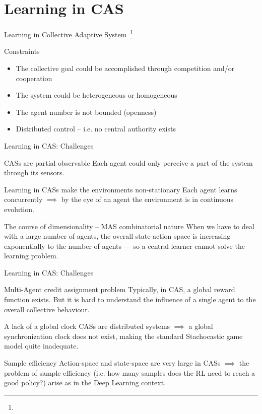 \documentclass[presentation]{beamer}\mode<presentation>{\usetheme{AMSBolognaFC}}
\begin{document}
\section{Learning in CAS}
\begin{frame}[c]{Learning in Collective Adaptive System~\footnote[frame]{}}
\begin{exampleblock}{Constraints}
	\begin{itemize}
		\item The collective goal could be accomplished through competition and/or cooperation 
		\item The system could be heterogeneous or homogeneous
		\item The agent number is not bounded (openness)
		\item Distributed control -- i.e. no central authority exists
	\end{itemize}
\end{exampleblock}
\end{frame}
\begin{frame}[c]{Learning in CAS: Challenges}
	\begin{exampleblock}{CASs are partial observable}
		Each agent could only perceive a part of the system through its sensors.
	\end{exampleblock}
	\begin{alertblock}{Learning in CASs make the environments non-stationary}
		Each agent learns concurrently $\implies$ by the eye of an agent the environment is in continuous evolution.
	\end{alertblock}
	\begin{alertblock}{The course of dimensionality -- MAS combinatorial nature}
		When we have to deal with a large number of agents, the overall state-action space is increasing exponentially to the number of agents --- so a central learner cannot solve the learning problem.
	\end{alertblock}
\end{frame}
\begin{frame}[c]{Learning in CAS: Challenges}
	\begin{exampleblock}{Multi-Agent credit assignment problem}
		Typically, in CAS, a global reward function exists. But it is hard to understand the influence of a single agent to
		the overall collective behaviour.
	\end{exampleblock}
	\begin{exampleblock}{A lack of a global clock}
		CASs are distributed systems $\implies$ a global synchronization clock does not exist, making the standard
		Stachocastic game model quite inadequate.
	\end{exampleblock}
	\begin{exampleblock}{Sample efficiency}
		Action-space and state-space are very large in CASs $\implies$ the problem of sample efficiency (i.e. how many samples does the RL need to reach a good policy?)
		arise as in the Deep Learning context. 
	\end{exampleblock}
\end{frame}
\end{document}
